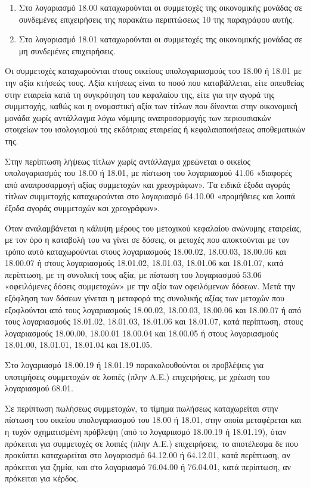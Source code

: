 \documentclass[A4,10pt,greek]{book}
\begin{document}
\begin{enumerate}
\item Στο λογαριασμό 18.00 καταχωρούνται οι συμμετοχές της οικονομικής μονάδας σε συνδεμένες επιχειρήσεις της παρακάτω περιπτώσεως 10 της παραγράφου αυτής.

\item Στο λογαριασμό 18.01 καταχωρούνται οι συμμετοχές της οικονομικής μονάδας σε μη συνδεμένες επιχειρήσεις.

\end{enumerate}

Οι συμμετοχές καταχωρούνται στους οικείους υπολογαριασμούς του 18.00 ή 18.01 με την αξία κτήσεώς τους. Αξία κτήσεως είναι το ποσό που καταβάλλεται, είτε απευθείας στην εταιρεία κατά τη συγκρότηση του κεφαλαίου της, είτε για την αγορά της συμμετοχής, καθώς και η ονομαστική αξία των τίτλων που δίνονται στην οικονομική μονάδα χωρίς αντάλλαγμα λόγω νόμιμης αναπροσαρμογής των περιουσιακών στοιχείων του ισολογισμού της εκδότριας εταιρείας ή κεφαλαιοποιήσεως αποθεματικών της.

Στην περίπτωση λήψεως τίτλων χωρίς αντάλλαγμα χρεώνεται ο οικείος υπολογαριασμός του 18.00 ή 18.01, με πίστωση του λογαριασμού 41.06 «διαφορές από αναπροσαρμογή αξίας συμμετοχών και χρεογράφων». Τα ειδικά έξοδα αγοράς τίτλων συμμετοχής καταχωρούνται στο λογαριασμό 64.10.00 «προμήθειες και λοιπά έξοδα αγοράς συμμετοχών και χρεογράφων».

Όταν αναλαμβάνεται η κάλυψη μέρους του μετοχικού κεφαλαίου ανώνυμης εταιρείας, με τον όρο η καταβολή του να γίνει σε δόσεις, οι μετοχές που αποκτούνται με τον τρόπο αυτό καταχωρούνται στους λογαριασμούς 18.00.02, 18.00.03, 18.00.06 και 18.00.07 ή στους λογαριασμούς 18.01.02, 18.01.03, 18.01.06 και 18.01.07, κατά περίπτωση, με τη συνολική τους αξία, με πίστωση του λογαριασμού 53.06 «οφειλόμενες δόσεις συμμετοχών» με την αξία των οφειλόμενων δόσεων. Μετά την εξόφληση των δόσεων γίνεται η μεταφορά της συνολικής αξίας των μετοχών που εξοφλούνται από τους λογαριασμούς 18.00.02, 18.00.03, 18.00.06 και 18.00.07 ή από τους λογαριασμούς 18.01.02, 18.01.03, 18.01.06 και 18.01.07, κατά περίπτωση, στους λογαριασμούς 18.00.00, 18.00.01 18.00.04 και 18.00.05 ή στους λογαριασμούς 18.01.00, 18.01.01, 18.01.04 και 18.01.05.

Στο λογαριασμό 18.00.19 ή 18.01.19 παρακολουθούνται οι προβλέψεις για υποτιμήσεις συμμετοχών σε λοιπές (πλην Α.Ε.) επιχειρήσεις, με χρέωση του λογαριασμού 68.01.

Σε περίπτωση πωλήσεως συμμετοχών, το τίμημα πωλήσεως καταχωρείται στην πίστωση του οικείου υπολογαριασμού του 18.00 ή 18.01, στην οποία μεταφέρεται και η τυχόν σχηματισμένη πρόβλεψη (από το λογαριασμό 18.00.19 ή 18.01.19), όταν πρόκειται για συμμετοχές σε λοιπές (πλην Α.Ε.) επιχειρήσεις, το αποτέλεσμα δε που προκύπτει καταχωρείται στο λογαριασμό 64.12.00 ή 64.12.01, κατά περίπτωση, αν πρόκειται για ζημία, και στο λογαριασμό 76.04.00 ή 76.04.01, κατά περίπτωση, αν πρόκειται για κέρδος.
\end{document}
